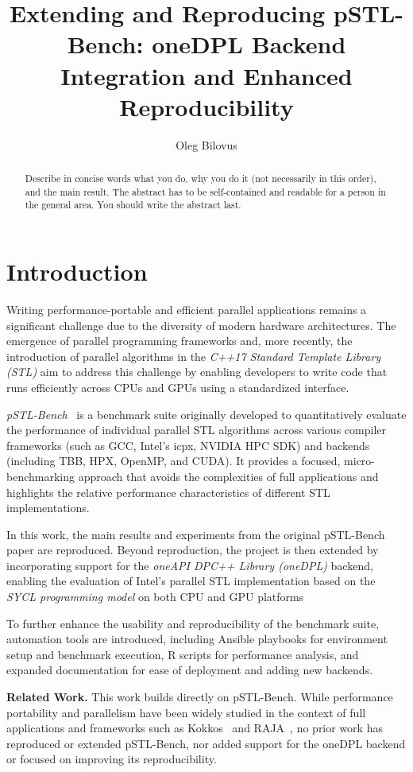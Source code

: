 \documentclass[sigconf]{acmart}
\title{Extending and Reproducing pSTL-Bench: oneDPL Backend Integration and Enhanced Reproducibility}
\author{Oleg Bilovus}
\affiliation{
  \institution{Department of Computer Science, University of Salerno}
  \city{Fisciano (SA)}
  \country{Italy}
}
\newcommand{\mypar}[1]{{\bf #1.}}
\begin{document}
\begin{abstract}
  Describe in concise words what you do, why you do it (not necessarily
  in this order), and the main result.  The abstract has to be
  self-contained and readable for a person in the general area. You
  should write the abstract last.
\end{abstract}

\maketitle

\section{Introduction}\label{sec:intro}
Writing performance-portable and efficient parallel applications remains a
significant challenge due to the diversity of modern hardware architectures.
The emergence of parallel programming frameworks and, more recently, the
introduction of parallel algorithms in the \textit{C++17 Standard Template
  Library (STL)} aim to address this challenge by enabling developers to write
code that runs efficiently across CPUs and GPUs using a standardized interface.

\textit{pSTL-Bench}~\cite{pSTL-Bench} is a benchmark suite originally developed to
quantitatively evaluate the performance of individual parallel STL algorithms
across various compiler frameworks (such as GCC, Intel's icpx, NVIDIA HPC SDK)
and backends (including TBB, HPX, OpenMP, and CUDA). It provides a focused,
micro-benchmarking approach that avoids the complexities of full applications
and highlights the relative performance characteristics of different STL
implementations.

In this work, the main results and experiments from the original
pSTL-Bench paper are reproduced. Beyond reproduction, the project is
then extended by incorporating support for the \textit{oneAPI DPC++ Library
  (oneDPL)} backend, enabling the evaluation of Intel’s parallel STL
implementation based on the \textit{SYCL programming model} on both CPU and GPU
platforms

To further enhance the usability and reproducibility of the benchmark suite,
automation tools are introduced, including Ansible playbooks for environment
setup and benchmark execution, R scripts for performance analysis, and expanded
documentation for ease of deployment and adding new backends.

\mypar{Related Work} This work builds directly on pSTL-Bench.
While performance portability and parallelism have been widely studied in
the context of full applications and frameworks such as Kokkos~\cite{Kokkos}
and RAJA~\cite{RAJA}, no prior work has reproduced or extended pSTL-Bench,
nor added support for the oneDPL backend or focused on improving its reproducibility.
\end{document}
